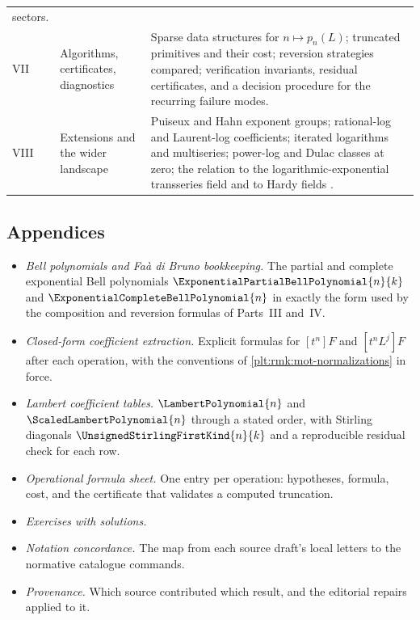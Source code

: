 \documentclass[11pt,oneside]{article}
\theoremstyle{plain}
\theoremstyle{definition}
\theoremstyle{remark}
\newcommand{\stirlingone}[2]{\UnsignedStirlingFirstKind{#1}{#2}}
\newcommand{\LamP}[1]{\LambertPolynomial{#1}}
\newcommand{\LamPsc}[1]{\ScaledLambertPolynomial{#1}}
\begin{document}
\begin{center}
\begin{tabular}{@{}lp{}p{}@{}}
  sectors. \\
VII & Algorithms, certificates, diagnostics &
  Sparse data structures for \(n\mapsto p_{n}(L)\); truncated primitives and
  their cost; reversion strategies compared; verification invariants, residual
  certificates, and a decision procedure for the recurring failure modes. \\
VIII & Extensions and the wider landscape &
  Puiseux and Hahn exponent groups; rational-log and Laurent-log coefficients;
  iterated logarithms and multiseries; power-log and Dulac classes at zero; the
  relation to the logarithmic-exponential transseries field and to Hardy
  fields \cite{hardy-orders,edgar-beginners,vanderhoeven-book,adh-book}. \\
\hline
\end{tabular}
\end{center}

\subsection{Appendices}
\label{plt:sec:mot-appendices}

\begin{itemize}
\item \emph{Bell polynomials and Fa\`a di Bruno bookkeeping.}  The partial and
  complete exponential Bell polynomials
  \(\ExponentialPartialBellPolynomial{n}{k}\) and
  \(\ExponentialCompleteBellPolynomial{n}\) in exactly the form used by the
  composition and reversion formulas of Parts~III and~IV.
\item \emph{Closed-form coefficient extraction.}  Explicit formulas for
  \([t^{n}]F\) and \([t^{n}L^{j}]F\) after each operation, with the conventions
  of \cref{plt:rmk:mot-normalizations} in force.
\item \emph{Lambert coefficient tables.}  \(\LamP{n}\) and \(\LamPsc{n}\)
  through a stated order, with Stirling diagonals
  \(\stirlingone{n}{k}\) and a reproducible residual check for each row.
\item \emph{Operational formula sheet.}  One entry per operation: hypotheses,
  formula, cost, and the certificate that validates a computed truncation.
\item \emph{Exercises with solutions.}
\item \emph{Notation concordance.}  The map from each source draft's local
  letters to the normative catalogue commands.
\item \emph{Provenance.}  Which source contributed which result, and the
  editorial repairs applied to it.
\end{itemize}
\end{document}
